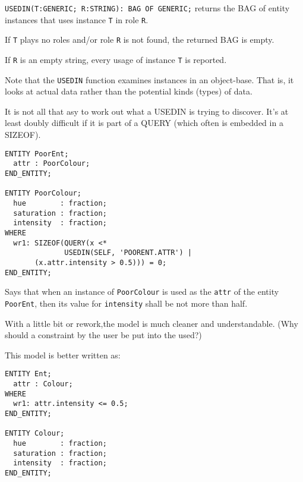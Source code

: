 
\texttt{USEDIN(T:GENERIC; R:STRING): BAG OF GENERIC;} returns the BAG of 
entity instances that uses instance \texttt{T} in role \texttt{R}.

   If \texttt{T} plays no roles and/or role \texttt{R} is not found, 
the returned BAG is empty.

    If \texttt{R} is an empty string, every usage of instance \texttt{T} 
is reported.

    Note that the \texttt{USEDIN} function examines instances in an 
object-base. That is, it looks at actual data rather than the potential 
kinds (types) of data.


\begin{remarks}
\remintro
{}

    It is not all that asy to work out what a USEDIN is trying to
discover. It's at least doubly difficult if it is part of
a QUERY (which often is embedded in a SIZEOF).

\remend
\end{remarks}


\begin{verbatim}
ENTITY PoorEnt;
  attr : PoorColour;
END_ENTITY;

ENTITY PoorColour;
  hue        : fraction;
  saturation : fraction;
  intensity  : fraction;
WHERE
  wr1: SIZEOF(QUERY(x <* 
              USEDIN(SELF, 'POORENT.ATTR') |
       (x.attr.intensity > 0.5))) = 0;
END_ENTITY;
\end{verbatim}
Says that when an instance of \texttt{PoorColour} is used as the 
\texttt{attr} of the entity \texttt{PoorEnt}, then its value for 
\texttt{intensity} shall be not more than half.


\begin{remarks}
\remintro
{}

With a little bit or rework,the model is much cleaner and understandable.
(Why should a constraint by the user be put into the used?)

\remend
\end{remarks}

\clearpage


    This model is better written as:
\begin{verbatim}
ENTITY Ent;
  attr : Colour;
WHERE
  wr1: attr.intensity <= 0.5;
END_ENTITY;

ENTITY Colour;
  hue        : fraction;
  saturation : fraction;
  intensity  : fraction;
END_ENTITY;
\end{verbatim}



